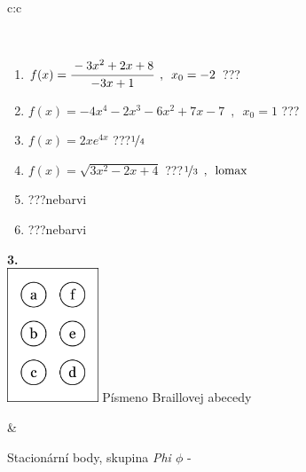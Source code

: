 \documentclass[10pt]{report}
\begin{document}
\begin{tabular}{c:c}
\begin{minipage}[c][104.5mm][t]{0.5\linewidth}
\begin{center}
\begin{minipage}{0.95\linewidth}
\begin{center}
\end{center}
\end{minipage}
\\[1mm]
\begin{minipage}{0.79\linewidth}
\begin{center}
\begin{varwidth}{\linewidth}
\begin{enumerate}
\normalsize
\item $f(x)=\cfrac{-3x^2+2x+8}{-3x+1}\enspace , \enspace x_0=-2$\quad \dotfill\; ???\;\dotfill \quad {}
\item $f(x)=-4x^4-2x^3-6x^2+7x-7\enspace , \enspace x_0=1$\quad \dotfill\; ???\;\dotfill \quad {}
\item $f(x)=2xe^{4x}$\quad \dotfill\; ???\;\dotfill \quad $\nicefrac{1}{4}$
\item $f(x)=\sqrt{3x^2-2x+4}$\quad \dotfill\; ???\;\dotfill \quad $\nicefrac{1}{3}\enspace , \enspace\mathrm{lomax}$
\item \quad \dotfill\; ???\;\dotfill \quad nebarvi
\item \quad \dotfill\; ???\;\dotfill \quad nebarvi
\end{enumerate}
\end{varwidth}
\end{center}
\end{minipage}
\begin{minipage}{0.20\linewidth}
\begin{center}
{\Huge\bfseries 3.} \\[2mm]
\includegraphics[height=40mm]{../images/braille.png}
{\small Písmeno Braillovej abecedy}
\end{center}
\end{minipage}
\end{center}
\end{minipage}
&
\begin{minipage}[c][104.5mm][t]{0.5\linewidth}
\begin{center}
\vspace{7mm}
{\huge Stacionární body, skupina \textit{Phi $\phi$} -}\\[5mm]

\end{center}
\end{minipage}
\end{tabular}
\end{document}
